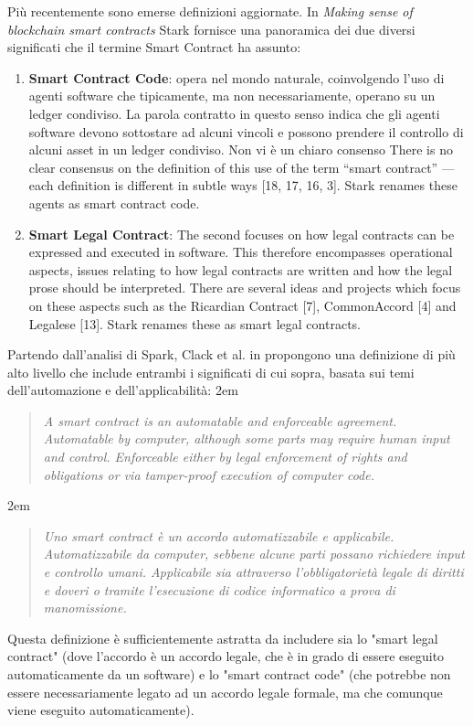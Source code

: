 Più recentemente sono emerse definizioni aggiornate.
In \textit{Making sense of blockchain smart contracts} \cite{making-sense-of-bsc}
Stark fornisce una panoramica dei due diversi significati che il termine
Smart Contract ha assunto:
\begin{enumerate}
	\item \textbf{Smart Contract Code}: opera nel mondo naturale,
	      coinvolgendo l'uso di agenti software che tipicamente,
	      ma non necessariamente, operano su un ledger condiviso. La parola contratto in questo senso
	      indica che gli agenti software devono sottostare ad alcuni vincoli e possono prendere il controllo
	      di alcuni asset in un ledger condiviso. Non vi è un chiaro consenso  There is no clear consensus on the
	      definition of this use of the term “smart contract” — each definition is different in subtle
	      ways [18, 17, 16, 3]. Stark renames these agents as smart contract code.
	\item \textbf{Smart Legal Contract}: The second focuses on how legal contracts can be expressed and executed in software.
	      This therefore encompasses operational aspects, issues relating to how legal contracts
	      are written and how the legal prose should be interpreted. There are several ideas and
	      projects which focus on these aspects such as the Ricardian Contract [7], CommonAccord
		      [4] and Legalese [13]. Stark renames these as smart legal contracts.
\end{enumerate}
Partendo dall'analisi di Spark, Clack et al. in \cite{Clack2016SmartCT} propongono una definizione
di più alto livello che include entrambi i significati di cui sopra, basata sui temi
dell'automazione e dell'applicabilità:
\begingroup
\advance\leftmargini 2em
\begin{quote}
	{
		{\em A smart contract is an automatable and enforceable agreement. Automatable by computer,
				although some parts may require human input and control. Enforceable either by legal
				enforcement of rights and obligations or via tamper-proof execution of computer code.  }
	}
\end{quote}
\endgroup
\begingroup
\advance\leftmargini 2em
\begin{quote}
	{
		{\em Uno smart contract è un accordo automatizzabile e applicabile. Automatizzabile da computer,
				sebbene alcune parti possano richiedere input e controllo umani. Applicabile sia attraverso
				l'obbligatorietà legale di diritti e doveri o tramite
				l'esecuzione di codice informatico a prova di manomissione.}
	}
\end{quote}
\endgroup
Questa definizione è sufficientemente astratta da includere sia lo "smart legal contract"
(dove l'accordo è un accordo legale, che è in grado di essere eseguito automaticamente da un software)
e lo "smart contract code" (che potrebbe non essere necessariamente legato ad un accordo legale formale,
ma che comunque viene eseguito automaticamente).



